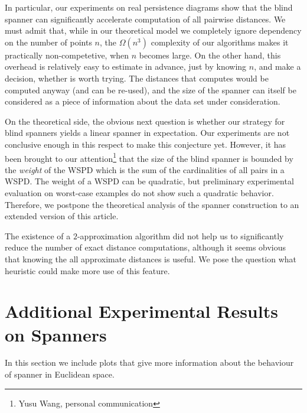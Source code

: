 In particular, our experiments on real persistence diagrams
show that the blind spanner can significantly accelerate
computation of all pairwise distances. We must admit that,
while in our theoretical model we completely ignore dependency on the number of points $n$,
the $\Omega(n^3)$ complexity of our algorithms makes it practically
non-competetive, when $n$ becomes large.
On the other hand, this overhead is relatively easy to estimate
in advance, just by knowing $n$, and make a decision,
whether \bgrdy is worth trying. 
The distances that \bgrdy computes would be computed anyway (and can be re-used),
and the size of the \bgrdy spanner can itself be considered as a piece
of information about the data set under consideration.


On the theoretical side, the obvious next question is whether our strategy
for blind spanners yields a linear spanner in expectation. 
Our experiments are not conclusive enough in this respect to make this conjecture yet.
However, it has been brought to our attention\footnote{Yusu Wang, personal communication}
that the size of the blind spanner is bounded by the \emph{weight} of the WSPD
which is the sum of the  cardinalities of all pairs in a WSPD.
The weight of a WSPD can be quadratic, but preliminary
experimental evaluation on worst-case examples do not show such a quadratic
behavior. Therefore, we postpone the theoretical analysis of the spanner construction
to an extended version of this article.

The existence of a $2$-approximation algorithm did not help us to significantly
reduce the number of exact distance computations, although it seems obvious
that knowing the all approximate distances is useful.
We pose the question what heuristic could make more use of this feature.

\newpage

\appendix

\section{Additional Experimental Results on Spanners}
\label{sec:spanners_euclidean_addendum}
In this section we include plots that give more information
about the behaviour of \bgrdy spanner in Euclidean space.

